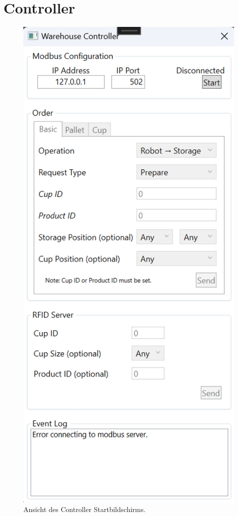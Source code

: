\section {Controller}
\begin{figure}
    \caption[Ansicht des Controller- Startbildschirm ]
    {\small Ansicht des Controller Startbildschirms. }\label{fig:figure5}
    \includegraphics[height = \textheight ]{Bilder/Controller_Startbildschirm}
    \centering
\end{figure}

